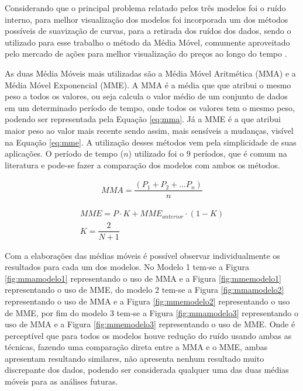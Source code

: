 \documentclass[acronym,symbols,table]{fei}
\begin{document}
\newpage 

Considerando que o principal problema relatado pelos três modelos foi o ruído interno, para melhor visualização dos modelos foi incorporada um dos métodos possíveis de suavização de curvas, para a retirada dos ruídos dos dados, sendo o utilizado para esse trabalho o método da Média Móvel, comumente aproveitado pelo mercado de ações para melhor visualização do preços ao longo do tempo \cite{mm}.

As duas Média Móveis mais utilizadas são a Média Móvel Aritmética (MMA) e a Média Móvel Exponencial (MME). A MMA é a média que que atribui o mesmo peso a todos os valores, ou seja calcula o valor médio de um conjunto de dados em um determinado período de tempo, onde todos os valores tem o mesmo peso, podendo ser representada pela Equação \ref{eq:mma}. Já a MME é a que atribui maior peso ao valor mais recente sendo assim, mais sensíveis a mudanças, visível na Equação \ref{eq:mme}. A utilização desses métodos vem pela simplicidade de suas aplicações. O período de tempo ($n$) utilizado foi o 9 períodos, que é comum na literatura \cite{bisi2009estrategias} e pode-se fazer a comparação dos modelos com ambos os métodos.

\begin{equation} \label{eq:mma}
    \begin{aligned}
{MMA}= \dfrac{({P_1} + {P_2} + ... {P_n})}{n}
    \end{aligned}
\end{equation}

\begin{equation} \label{eq:mme}
    \begin{aligned}
    {MME}  = {P} \cdot {K} + {MME}_{anterior} \cdot ({1} - {K})\\
    {K} = \dfrac{{2}}{N+1}
    \end{aligned}
\end{equation}

Com a elaborações das médias móveis é possível observar individualmente os resultados para cada um dos modelos. No Modelo 1 tem-se a Figura \ref{fig:mmamodelo1} representando o uso de MMA e a Figura \ref{fig:mmemodelo1} representando o uso de MME, do modelo 2 tem-se a Figura \ref{fig:mmamodelo2} representando o uso de MMA e a Figura \ref{fig:mmemodelo2} representando o uso de MME, por fim do modelo 3 tem-se a Figura \ref{fig:mmamodelo3} representando o uso de MMA e a Figura \ref{fig:mmemodelo3} representando o uso de MME. Onde é perceptível que para todos os modelos houve redução do ruído usando ambas as técnicas, fazendo uma comparação direta entre a MMA e o MME, ambas apresentam resultando similares, não apresenta nenhum resultado muito discrepante dos dados, podendo ser considerada qualquer uma das duas médias móveis para as análises futuras.  
\end{document}

